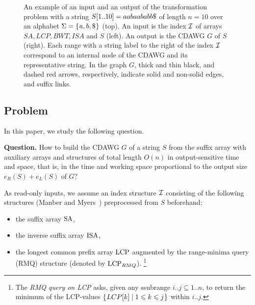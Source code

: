 \begin{figure}[t]
\begin{minipage}[c]{0.44\textwidth}
\centering
{}
\end{minipage}
\hspace{20mm}
\begin{minipage}[c]{0.44\textwidth}
\centering
{}
\end{minipage}
\caption{An example of an input and an output of the transformation problem with a string $S[1..10] = aabaababb\daller$ of length $n = 10$ over an alphabet $\Sigma = \{\kern0.05ema, b, \$\kern0.05em\}$ (top).
  An input is the index $\mathcal{I}$ of arrays $SA, LCP, BWT, ISA$ and $S$ (left). An output is the CDAWG $G$ of $S$ (right).
  Each range with a string label to the right of the index $\mathcal{I}$ correspond to an internal node of the CDAWG and its representative string. 
  In the graph $G$, thick and thin black, and dashed red arrows, respectively, indicate solid and non-solid edges, and suffix links.
}\label{fig:example:problem}
\end{figure}


\subsection{Problem}
In this paper, 
we study the following question. 

\vspace{-0.25\baselineskip}
\begin{trivlist}{\item[] \noindent \textbf{Question.}
How to build the CDAWG $G$ of a string $S$ from the suffix array with auxiliary arrays and structures of total length $O(n)$ in output-sensitive time and space, that is, in the time and working space proportional to the output size ${e_R(S) + e_L(S)}$ of $G$?
}\end{trivlist}
\vspace{-0.25\baselineskip}


As read-only inputs, we assume an index structure $\mathcal{I}$ consisting of the following structures (Manber and Myers~\cite{manber:myers1993suffixarrays}) preprocessed from $S$ beforehand: 
\begin{itemize}
\item the suffix array $\mathrm{SA}$,
\item the inverse suffix array $\mathrm{ISA}$,
\item the longest common prefix array $\mathrm{LCP}$ augmented by the range-minima query (RMQ) structure (denoted by $\mathrm{LCP}_{RMQ}$).%
\footnote{
The \textit{RMQ query on LCP} asks, given any ssubrange $i..j \subseteq 1..n$, to return the minimum of the LCP-values $\{\kern0.05emLCP[k] \mid 1\leqslant k\leqslant j\kern0.05em\}$ within $i..j$.
}
\end{itemize}


